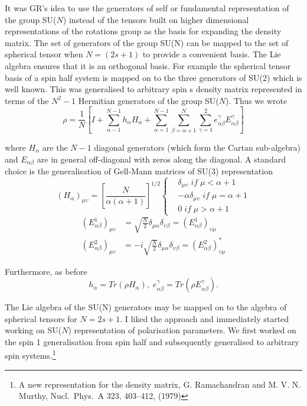It was GR’s idea to use the generators of self or fundamental representation of the group SU($N$) instead of the tensors built on higher dimensional representations of the rotations group as the basis for expanding the density
matrix. The set of generators of the group SU(N) can be mapped to the set of spherical tensor when $N = (2s + 1)$ to provide a convenient basis. The Lie algebra ensures that it is an orthogonal basis. For example the spherical tensor basis of a spin half system is mapped on to the three generators of SU(2) which is well known. This was generalised to arbitrary spin s density matrix represented in terms of the $N^{2}-1$ Hermitian generators of the group SU($N$). Thus we wrote
$$
\rho = \dfrac{1}{N}\left[I + \sum\limits_{\alpha-1}^{N-1}h_{\alpha}H_{\alpha} + \sum\limits_{\alpha=1}^{N-1}\sum\limits_{\beta=\alpha+1}^{N}\sum\limits_{\gamma=1}^{2} e_{\alpha \beta}^{\gamma}E_{\alpha \beta}^{\gamma}\right]
$$

where $H_{\alpha}$ are the $N-1$ diagonal generators (which form the Cartan sub-algebra) and $E_{\alpha\beta}$ are in general off-diagonal with zeros along the diagonal. A standard choice is the generalisation of Gell-Mann matrices of SU(3) representation
\begin{equation*}
(H_{\alpha})_{\mu\upsilon} = \left[\dfrac{N}{\alpha(\alpha + 1)}\right]^{1/2} 
\begin{cases} 
& \delta_{\mu\upsilon}\; if\; \mu < \alpha + 1\\
& -\alpha \delta_{\mu\upsilon}\; if\; \mu=\alpha + 1\\
& 0\; if\; \mu > \alpha + 1 
\end{cases}
\end{equation*}
\begin{align*}
(E_{\alpha \beta}^{1})_{\mu\upsilon} &= \sqrt{\frac{N}{2}} \delta_{\mu \alpha} \delta_{\upsilon\beta} = (E_{\alpha \beta}^{1})_{\upsilon \mu}\\
(E_{\alpha \beta}^{2})_{\mu\upsilon} &= -i\sqrt{\frac{N}{2}} \delta_{\mu \alpha} \delta_{\upsilon\beta} = (E_{\alpha \beta}^{2})_{\upsilon \mu}^{\ast}
\end{align*}

Furthermore, as before
$$
h_{\alpha}= Tr(\rho H_{\alpha}), \; e_{\alpha \beta}^{\gamma}= Tr(\rho E_{\alpha\beta}^{\gamma}).
$$

The Lie algebra of the SU(N) generators may be mapped on to the algebra of spherical tensors for $N = 2s+1$. I liked the approach and immediately started working on SU($N$) representation of polarisation parameters. We first worked on the spin 1 generalisation from spin half and subsequently generalised to arbitrary spin systems.\footnote{A new representation for the density matrix, G. Ramachandran and M. V. N. Murthy, Nucl.\ Phys.\ A 323, 403--412, (1979)} 


